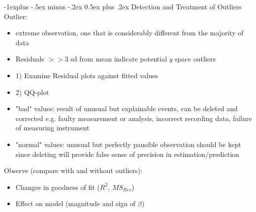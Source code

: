 \documentclass[a4paper,12pt,landscape]{article}
\makeatletter
\renewcommand{\subsection}{\@startsection{subsection}{2}{0mm}%
                                {-1explus -.5ex minus -.2ex}%
                                {0.5ex plus .2ex}%
                                {\normalfont\normalsize\bfseries\color{blue}}}
\makeatother
\begin{document}
\begin{multicols}{3}
        \subsection{Detection and Treatment of Outliers}
        Outlier:
        \begin{itemize}
            \item extreme observation, one that is considerably different from the majority of data
            \item Residuals $>> 3$ sd from mean indicate potential $y$ space  outliers
            \item 1) Examine Residual plots against fitted values
            \item 2) QQ-plot
            \item "bad" values: result of unusual but explainable events, can be deleted and corrected
                \subitem e.g. faulty measurement or analysis, incorrect recording data, failure of measuring instrument
            \item "normal" values: unusual but perfectly pausible observation
                \subitem should be kept since deleting will provide false sense of precision in estimation/prediction
        \end{itemize}
        Observe (compare with and without outliers):
        \begin{itemize}
            \item Changes in goodness of fit ($R^2$, $MS_{Res}$)
            \item Effect on model (magnitude and sign of $\beta$)
        \end{itemize}


\end{multicols}
\end{document}
